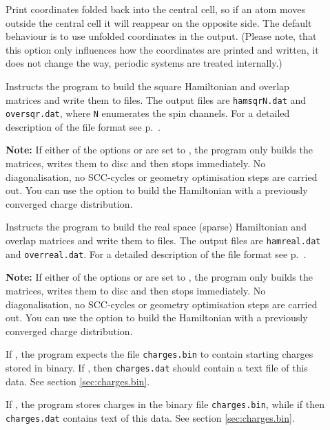 \begin{description}
\item[] Print coordinates folded back into the
  central cell, so if an atom moves outside the central cell it will
  reappear on the opposite side. The default behaviour is to use
  unfolded coordinates in the output. (Please note, that this option
  only influences how the coordinates are printed and written, it does
  not change the way, periodic systems are treated internally.)

\item[] Instructs the program to build the square
  Hamiltonian and overlap matrices and write them to files. The output
  files are \verb|hamsqrN.dat| and \verb|oversqr.dat|, where \verb|N|
  enumerates the spin channels. For a detailed description of the file
  format see p.~.

  \textbf{Note:} If either of the options  or  are
  set to , the program only builds the matrices, writes them to disc and
  then stops immediately. No diagonalisation, no SCC-cycles or geometry
  optimisation steps are carried out. You can use the 
  option to build the Hamiltonian with a previously converged charge
  distribution.

\item[] Instructs the program to build the real space
  (sparse) Hamiltonian and overlap matrices and write them to
  files. The output files are \verb|hamreal.dat| and
  \verb|overreal.dat|. For a detailed description of the file format
  see p.~.

  \textbf{Note:} If either of the options  or  are
  set to , the program only builds the matrices, writes them to disc and
  then stops immediately. No diagonalisation, no SCC-cycles or geometry
  optimisation steps are carried out. You can use the 
  option to build the Hamiltonian with a previously converged charge
  distribution.

\item[] If , the program expects the file
  \verb|charges.bin| to contain starting charges stored in binary. If ,
  then \verb|charges.dat| should contain a text file of this data. See section
  \ref{sec:charges.bin}.

\item[] If , the program stores charges in the
  binary file \verb|charges.bin|, while if  then \verb|charges.dat|
  contains text of this data. See section \ref{sec:charges.bin}.


\end{description}
